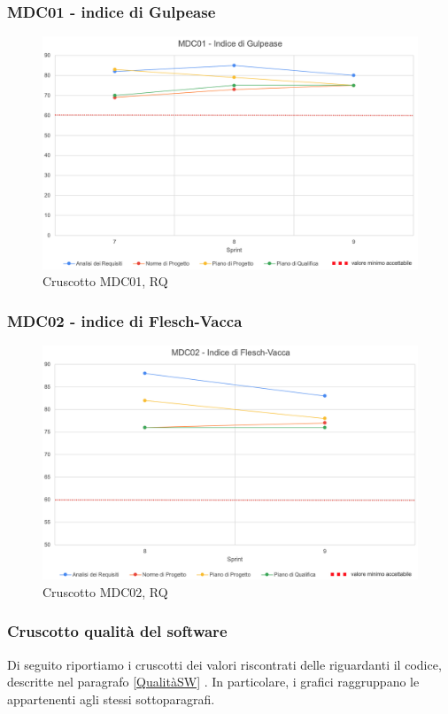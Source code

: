 \subsubsection*{MDC01 - indice di Gulpease}
\begin{figure}[H]
    \centering
    \includegraphics[scale = 0.6]{immagini/GulpeaseRQ.png}
    \caption{Cruscotto MDC01, RQ}
\end{figure}

\subsubsection*{MDC02 - indice di Flesch-Vacca}
\begin{figure}[H]
    \centering
    \includegraphics[scale = 0.6]{immagini/fleschRQ.png}
    \caption{Cruscotto MDC02, RQ}
\end{figure}
\newpage
\subsubsection{Cruscotto  qualità del software}
Di seguito riportiamo i cruscotti dei valori riscontrati delle  riguardanti il codice, descritte nel paragrafo \ref{QualitàSW} . In particolare, i grafici raggruppano le  appartenenti agli stessi sottoparagrafi.

